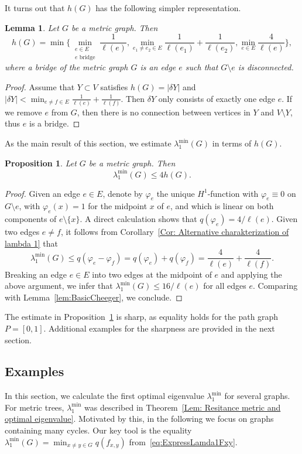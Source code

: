 \documentclass[reqno]{amsart}
\theoremstyle{plain}
\newtheorem{lem}[thm]{Lemma}
\newtheorem{prop}[thm]{Proposition}
\theoremstyle{definition}
\theoremstyle{remark}
\numberwithin{equation}{section}
\begin{document}
It turns out that $h(G)$ has the following simpler representation.
\begin{lem}
	Let $G$ be a metric graph. Then 
	\[
	h(G) = \min \Big \{\min\limits_{\substack{e\in E \\ e \text{ bridge}}} \frac{1}{\ell(e)},\min_{e_1\neq e_2 \in E} \frac{1}{\ell (e_1)} + \frac{1}{\ell(e_2)}, \min_{e \in E} \frac{4}{\ell(e)} \Big \},
	\]
	where a bridge of the metric graph $G$ is an edge $e$ such that $G \setminus e$ is disconnected.
\end{lem}
\begin{proof}
	Assume that $Y\subset V$ satisfies $h(G) = |\delta Y|$ and $|\delta Y| < \min_{e \neq f \in E} \frac{1}{\ell (e)} + \frac{1}{\ell(f)}$. Then $\delta Y$ only consists of exactly one edge $e$. If we remove $e$ from $G$, then there is no connection between vertices in $Y$ and $V\setminus Y$, thus $e$ is a bridge.
\end{proof}
As the main result of this section, we estimate $\lambda_1^{\min}(G)$ in terms of $h(G)$.

\begin{prop}\label{Prop: Cheeger}
	Let $G$ be a metric graph. Then 
	\[
	\lambda_{1}^{\min}(G) \leq 4 h(G).
	\]
\end{prop}
\begin{proof}
	Given an edge $e \in E$, denote by $\varphi_e$ the unique $H^1$-function with $\varphi_e \equiv 0$ on $G \setminus e$, with $\varphi_e(x) = 1$ for the midpoint $x$ of $e$, and which is linear on both components of $e \setminus \{x\}$. A direct calculation shows that $q(\varphi_e) = 4/\ell(e)$.
	Given two edges $e \neq f$, it follows from Corollary~\ref{Cor: Alternative charakterization of lambda 1} that
	\[
	\lambda_{1}^{\min}(G) \leq q ( \varphi_e - \varphi_f ) = q ( \varphi_e) + q(\varphi_f )  = \frac{4}{\ell(e)} + \frac{4}{\ell(f)}.
	\]
	Breaking an edge $e \in E$ into two edges at the midpoint of $e$ and applying the above argument, we infer that $\lambda_{1}^{\min}(G) \le 16/\ell(e)$ for all edges $e$. Comparing with Lemma~\ref{lem:BasicCheeger}, we conclude.
\end{proof}
The estimate in Proposition~\ref{Prop: Cheeger} is sharp, as equality holds for the path graph $P = [0,1]$. Additional examples for  the sharpness are provided in the next section.


\subsection{Examples}
In this section, we calculate the first optimal eigenvalue $\lambda_1^{\min}$ for several graphs. For metric trees, $\lambda_1^{\min}$ was described in  Theorem~\ref{Lem: Resitance metric and optimal eigenvalue}. Motivated by this, in the following we focus on graphs containing many cycles.
Our key tool is the equality $\lambda_1^{\min} (G) = \min_{x \neq y \in G} q(f_{x,y})$ from~\eqref{eq:ExpressLamda1Fxy}.
\end{document}
